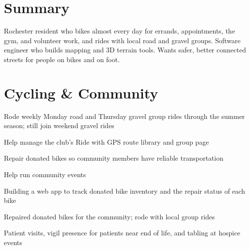 \documentclass[]{deedy-resume-openfont}
\begin{document}
\begin{minipage}[t]{0.67\textwidth}

\section{Summary}
Rochester resident who bikes almost every day for errands, appointments, the gym, and volunteer work, and rides with local road and gravel groups. Software engineer who builds mapping and 3D terrain tools. Wants safer, better connected streets for people on bikes and on foot.
\sectionsep

\section{Cycling \& Community}
\vspace{\topsep}
\begin{tightemize}
\item Rode weekly Monday road and Thursday gravel group rides through the summer season; still join weekend gravel rides
\item Help manage the club's Ride with GPS route library and group page
\end{tightemize}
\sectionsep

\newline
{}
\begin{tightemize}
\item Repair donated bikes so community members have reliable transportation
\item Help run community events
\item Building a web app to track donated bike inventory and the repair status of each bike
\end{tightemize}
\sectionsep

Repaired donated bikes for the community; rode with local group rides
\sectionsep

Patient visits, vigil presence for patients near end of life, and tabling at hospice events
\sectionsep


\end{minipage}
\end{document}

